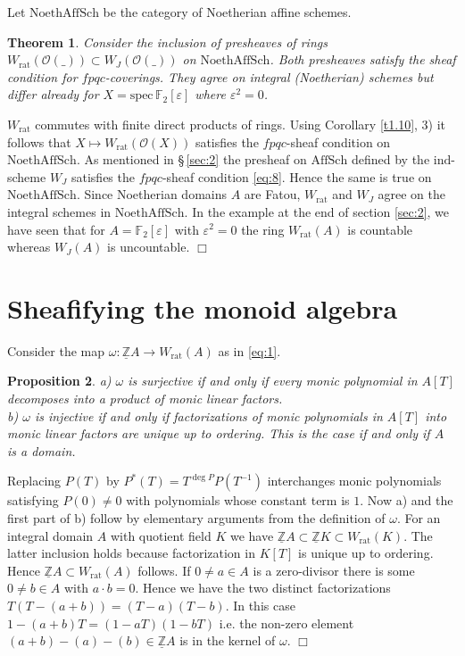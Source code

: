 \documentclass[12pt,leqno]{article}
\newcommand{\F}{{\mathbb{F}}}
\newcommand{\Z}{{\mathbb{Z}}}
\newcommand{\uZ}{\underline{\Z}}
\newcommand{\NAS}{\mathrm{NoethAffSch}}
\newcommand{\AS}{\mathrm{AffSch}}
\newcommand{\spec}{\mathrm{spec}\,}
\newcommand{\ind}{\mathrm{ind}}
\newcommand{\rat}{\mathrm{rat}}
\newcommand{\Oh}{{\mathcal O}}
\newtheorem{theorem}{Theorem}[section]
\newtheorem{prop}[theorem]{Proposition}
\newenvironment{proof}{\noindent {\bf Proof}}{\mbox{}\hspace*{\fill}$\Box$}
\begin{document}
Let $\NAS$ be the category of Noetherian affine schemes.

\begin{theorem}
\label{t3.4}
Consider the inclusion of presheaves of rings $W_{\rat} (\Oh (\_ )) \subset W_J (\Oh (\_ ))$ on $\NAS$. Both presheaves satisfy the sheaf condition for $fpqc$-coverings. They agree on integral (Noetherian) schemes but differ already for $X = \spec \F_2 [\varepsilon]$ where $\varepsilon^2 = 0$.
\end{theorem}

\begin{proof}
$W_{\rat}$ commutes with finite direct products of rings. Using Corollary \ref{t1.10}, 3) it follows that $X \mapsto W_{\rat} (\Oh (X))$ satisfies the $fpqc$-sheaf condition on $\NAS$. As mentioned in \S\,\ref{sec:2} the presheaf on $\AS$ defined by the $\ind$-scheme $W_J$ satisfies the $fpqc$-sheaf condition \eqref{eq:8}. Hence the same is true on $\NAS$. Since Noetherian domains $A$ are Fatou, $W_{\rat}$ and $W_J$ agree on the integral schemes in $\NAS$. In the example at the end of section \ref{sec:2}, we have seen that for $A = \F_2 [\varepsilon]$ with $\varepsilon^2 = 0$ the ring $W_{\rat} (A)$ is countable whereas $W_J (A)$ is uncountable.
\end{proof}
%
\section{Sheafifying the monoid algebra} \label{sec:4}

Consider the map $\omega : \uZ A \to W_{\rat} (A)$ as in \eqref{eq:1}.

\begin{prop}
\label{t4.1}
a) $\omega$ is surjective if and only if every monic polynomial in $A [T]$ decomposes into a product of monic linear factors.\\
b) $\omega$ is injective if and only if factorizations of monic polynomials in $A [T]$ into monic linear factors are unique up to ordering. This is the case if and only if $A$ is a domain.
\end{prop}

\begin{proof}
Replacing $P (T)$ by $P^* (T) = T^{\deg P} P (T^{-1})$ interchanges monic polynomials satisfying $P (0) \neq 0$ with polynomials whose constant term is $1$. Now a) and the first part of b) follow by elementary arguments from the definition of $\omega$. For an integral domain $A$ with quotient field $K$ we have $\uZ A \subset \uZ K \subset W_{\rat} (K)$. The latter inclusion holds because factorization in $K [T]$ is unique up to ordering. Hence $\uZ A \subset W_{\rat} (A)$ follows. If $0 \neq a \in A$ is a zero-divisor there is some $0 \neq b \in A$ with $a \cdot b = 0$. Hence we have the two distinct factorizations $T (T - (a+b)) = (T-a) (T-b)$. In this case $1 - (a+b) T = (1-aT) (1 - bT)$ i.e. the non-zero element $(a+b) - (a) - (b) \in \uZ A$ is in the kernel of $\omega$. 
\end{proof}
\end{document}
